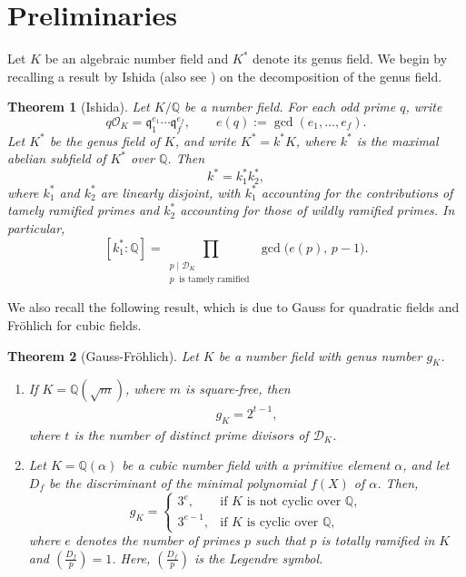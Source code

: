 \documentclass[11pt,reqno]{amsart}
\newcommand{\cD}{\mathcal{D}}
\newtheorem{theorem}{Theorem}[section]
\theoremstyle{definition}
\theoremstyle{remark}
\begin{document}
\medskip

\section{\bf Preliminaries}\label{prelims}
\medskip
Let $K$ be an algebraic number field and $K^*$ denote its genus field. We begin by recalling a result by Ishida \cite{Ish74} (also see \cite[Theorem~3]{Ishidabook}) on the decomposition of the genus field.
\begin{theorem}[Ishida]\label{lemma:k1k2decomp}
Let $K/\mathbb{Q}$ be a number field.  
For each odd prime $q$, write
\[
    q\mathcal{O}_K = \mathfrak{q}_1^{e_1}\cdots \mathfrak{q}_f^{e_f},
    \qquad
    e(q):=\gcd(e_1,\dots,e_f).
\]
Let $K^{*}$ be the genus field of $K$, and write $K^{*}=k^{*}K$, where $k^{*}$ is the maximal
abelian subfield of $K^{*}$ over $\mathbb{Q}$.  Then
\[
    k^{*} = k_1^{*} k_2^{*},
\]
where $k_1^{*}$ and $k_2^{*}$ are linearly disjoint, with $k_1^{*}$ accounting for the contributions of tamely ramified primes and $k_2^{*}$ accounting for those of wildly ramified primes. In particular,
\[
    [k_1^{*}:\mathbb{Q}]
    = \prod_{\substack{p\mid\mathcal{D}_K \\ p ~\text{ is tamely ramified }}}
      \gcd\bigl(e(p),\,p-1\bigr).
\]
\end{theorem}

We also recall the following result, which is due to Gauss for quadratic fields and Fr\"{o}hlich \cite{Fr59} for cubic fields.
\begin{theorem}[Gauss-Fr\"{o}hlich]\label{genus:quad-cubic}
    Let $K$ be a number field with genus number $g_K$.
    \begin{enumerate}
        \item If $K = \mathbb{Q}(\sqrt{m})$, where $m$ is square-free, then
        \begin{align*}
              g_K = 2^{t - 1},
        \end{align*}
         where $t$ is the number of distinct prime divisors of $\cD_K$.\\

         \item Let $K = \mathbb{Q}(\alpha)$ be a cubic number field with a primitive element $\alpha$, and let $D_f$ be the discriminant of the minimal polynomial $f(X)$ of $\alpha$. Then, 
        $$
            g_K =
            \begin{cases} 
                3^{e}, & \text{if } K \text{ is not cyclic over } \mathbb{Q}, \\
                3^{e-1}, & \text{if } K \text{ is cyclic over } \mathbb{Q},
            \end{cases}
        $$
        where $e$ denotes the number of primes $p$ such that $p$ is totally ramified in $K$ and $\left( \frac{D_f}{p} \right) = 1$. Here,  $\left( \frac{D_f}{p} \right)$ is the Legendre symbol.        
    \end{enumerate}
\end{theorem}
\end{document}
